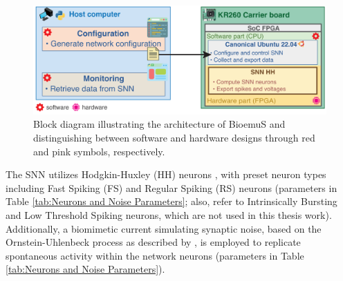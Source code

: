 \begin{figure}[ht!]
    \begin{center}
    \includegraphics[width=0.9\linewidth]{Figure/Architecture BioEmus.jpg}
    \end{center}
    \caption{Block diagram illustrating the architecture of BioemuS and distinguishing between software and hardware designs through red and pink symbols, respectively.}
    \label{fig:Architecture BioEmus}
\end{figure}

The SNN utilizes Hodgkin-Huxley (HH) neurons \cite{HodgkinHuxley1990}, with preset neuron types including Fast Spiking (FS) and Regular Spiking (RS) neurons (parameters in Table \ref{tab:Neurons and Noise Parameters}; also, refer to Intrinsically Bursting and Low Threshold Spiking neurons, which are not used in this thesis work). Additionally, a biomimetic current simulating synaptic noise, based on the Ornstein-Uhlenbeck process \cite{Destexhe2001} as described by \cite{Khoyratee2019}, is employed to replicate spontaneous activity within the network neurons (parameters in Table \ref{tab:Neurons and Noise Parameters}). 

